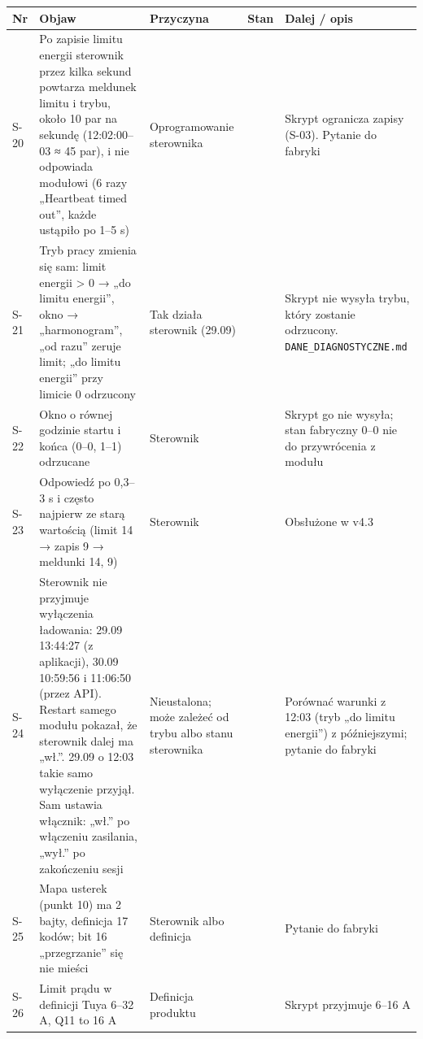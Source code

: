 \documentclass[11pt,a4paper]{article}
\begin{document}
\begin{longtable}{>{\raggedright\arraybackslash}p{3.00cm}>{\raggedright\arraybackslash}p{4.13cm}>{\raggedright\arraybackslash}p{2.33cm}>{\raggedright\arraybackslash}p{0.81cm}>{\raggedright\arraybackslash}p{4.13cm}}
\toprule
\rowcolor{apteallight}\textbf{Nr} & \textbf{Objaw} & \textbf{Przyczyna} & \textbf{Stan} & \textbf{Dalej / opis} \\
\midrule\endhead
\bottomrule\endfoot
S-20 & Po zapisie limitu energii sterownik przez kilka sekund powtarza meldunek limitu i trybu, około 10 par na sekundę (12:02:00–03 {\symbolfont≈} 45 par), i nie odpowiada modułowi (6 razy „Heartbeat timed out”, każde ustąpiło po 1–5 s) & Oprogramowanie sterownika & \leavevmode{\symbolfont\color{apamber}\textbf{◐}} & Skrypt ogranicza zapisy (S-03). Pytanie do fabryki \\
S-21 & Tryb pracy zmienia się sam: limit energii > 0 {\symbolfont→} „do limitu energii”, okno {\symbolfont→} „harmonogram”, „od razu” zeruje limit; „do limitu energii” przy limicie 0 odrzucony & Tak działa sterownik (29.09) & \leavevmode{\symbolfont\color{apamber}\textbf{◐}} & Skrypt nie wysyła trybu, który zostanie odrzucony. \texttt{DANE\_\allowbreak{}DIAGNOSTYCZNE.\allowbreak{}md} \\
S-22 & Okno o równej godzinie startu i końca (0–0, 1–1) odrzucane & Sterownik & \leavevmode{\symbolfont\color{apamber}\textbf{◐}} & Skrypt go nie wysyła; stan fabryczny 0–0 nie do przywrócenia z modułu \\
S-23 & Odpowiedź po 0,3–3 s i często najpierw ze starą wartością (limit 14 {\symbolfont→} zapis 9 {\symbolfont→} meldunki 14, 9) & Sterownik & \leavevmode{\symbolfont\color{apamber}\textbf{◐}} & Obsłużone w v4.3 \\
S-24 & Sterownik nie przyjmuje wyłączenia ładowania: 29.09 13:44:27 (z aplikacji), 30.09 10:59:56 i 11:06:50 (przez API). Restart samego modułu pokazał, że sterownik dalej ma „wł.”. 29.09 o 12:03 takie samo wyłączenie przyjął. Sam ustawia włącznik: „wł.” po włączeniu zasilania, „wył.” po zakończeniu sesji & Nieustalona; może zależeć od trybu albo stanu sterownika & \leavevmode{\symbolfont\color{apred}\textbf{✘}} & Porównać warunki z 12:03 (tryb „do limitu energii”) z późniejszymi; pytanie do fabryki \\
S-25 & Mapa usterek (punkt 10) ma 2 bajty, definicja 17 kodów; bit 16 „przegrzanie” się nie mieści & Sterownik albo definicja & \leavevmode{\symbolfont\color{apred}\textbf{✘}} & Pytanie do fabryki \\
S-26 & Limit prądu w definicji Tuya 6–32 A, Q11 to 16 A & Definicja produktu & \leavevmode{\symbolfont\color{apamber}\textbf{◐}} & Skrypt przyjmuje 6–16 A \\

\end{longtable}
\end{document}
